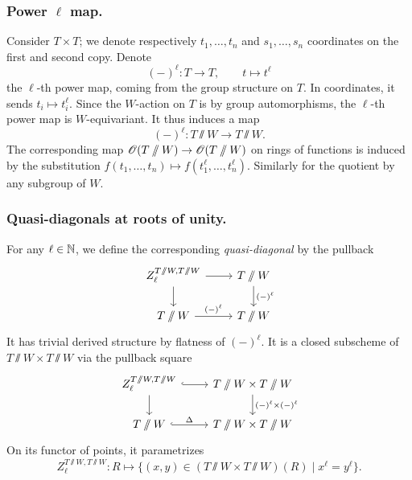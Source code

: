 \subsubsection{Power $\ell$ map.}
Consider $T \times T$; we denote respectively $t_1, \dots, t_n$ and $s_1, \dots, s_n$ coordinates on the first and second copy. 
%
Denote
\begin{equation*}
    (-)^{\ell} : T \to T, \qquad t \mapsto t^{\ell}
\end{equation*}
the $\ell$-th power map, coming from the group structure on $T$. In coordinates, it sends $t_i \mapsto t_i^{\ell}$. Since the $W$-action on $T$ is by group automorphisms, the $\ell$-th power map is $W$-equivariant. It thus induces a map
\begin{equation*}
    (-)^{\ell} : T \sslash W \to T \sslash W.
\end{equation*}
The corresponding map $\operatorname{\mathscr{O}}(T \sslash W) \to \operatorname{\mathscr{O}}(T \sslash W)$ on rings of functions is induced by the substitution $f(t_1, \dots, t_n) \mapsto f(t^{\ell}_1, \dots, t^{\ell}_n)$. Similarly for the quotient by any subgroup of $W$.

\subsubsection{Quasi-diagonals at roots of unity.}
For any $\ell \in \operatorname{\mathbb{N}}$, we define the corresponding \textit{quasi-diagonal} by the pullback
\begin{equation*}
\begin{tikzcd}
Z^{T \sslash W, T\sslash W}_{\ell} \arrow[d] \arrow[r]  & T \sslash W \arrow[d, "(-)^{\ell}"]  \\
T \sslash W \arrow[r, "(-)^{\ell}"] & T \sslash W
\end{tikzcd}
\end{equation*}
It has trivial derived structure by flatness of $(-)^{\ell}$.
It is a closed subscheme of $T \sslash W \times T \sslash W$ via the pullback square
\begin{equation*}
    \begin{tikzcd}
        Z^{T \sslash W, T\sslash W}_{\ell} \arrow[r, hook] \arrow[d] & T\sslash W \times T\sslash W \arrow[d, "(-)^{\ell} \times (-)^{\ell}"] \\
        T\sslash W \arrow[r, hook, "\Delta"] & T\sslash W \times T\sslash W
    \end{tikzcd}
\end{equation*}
On its functor of points, it parametrizes
\begin{equation*}
Z^{T \sslash W, T\sslash W}_{\ell}: R \mapsto \{ (x, y) \in (T\sslash W \times T\sslash W)(R) \mid x^{\ell} = y^{\ell} \}.
\end{equation*}

